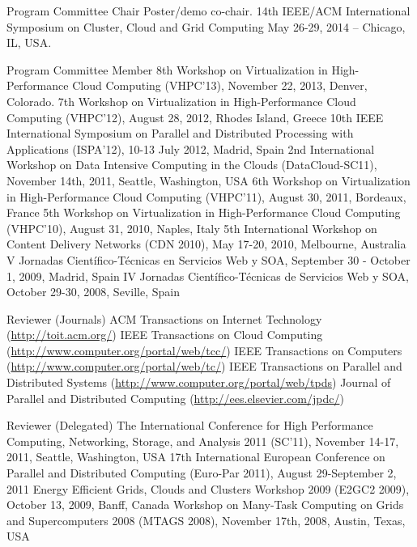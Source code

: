 \documentclass{resume}
\begin{document}
\begin{category}{Program Committee Chair}
\citembullet Poster/demo co-chair. 14th IEEE/ACM International Symposium on Cluster, Cloud and Grid Computing
May 26-29, 2014 -- Chicago, IL, USA.
\end{category}

\vspace{1em}

\begin{category}{Program Committee Member}
\citembullet 8th Workshop on Virtualization in High-Performance Cloud Computing (VHPC'13), November 22, 2013, Denver, Colorado.
\citembullet 7th Workshop on Virtualization in High-Performance Cloud Computing (VHPC'12), August 28, 2012, Rhodes Island, Greece
\citembullet 10th IEEE International Symposium on Parallel and Distributed Processing with Applications (ISPA'12), 10-13 July 2012, Madrid, Spain 
\citembullet 2nd International Workshop on Data Intensive Computing in the Clouds (DataCloud-SC11), November 14th, 2011, Seattle, Washington, USA
\citembullet 6th Workshop on Virtualization in High-Performance Cloud Computing (VHPC'11), August 30, 2011, Bordeaux, France
\citembullet 5th Workshop on Virtualization in High-Performance Cloud Computing (VHPC'10), August 31, 2010, Naples, Italy
\citembullet 5th International Workshop on Content Delivery Networks (CDN 2010), May 17-20, 2010, Melbourne, Australia
\citembullet V Jornadas Científico-Técnicas en Servicios Web y SOA, September 30 - October 1, 2009, Madrid, Spain
\citembullet IV Jornadas Científico-Técnicas de Servicios Web y SOA, October 29-30, 2008, Seville, Spain
\end{category}

\begin{category}{Reviewer (Journals)}
\citembullet ACM Transactions on Internet Technology (\url{http://toit.acm.org/})
\citembullet IEEE Transactions on Cloud Computing (\url{http://www.computer.org/portal/web/tcc/})
\citembullet IEEE Transactions on Computers (\url{http://www.computer.org/portal/web/tc/})
\citembullet IEEE Transactions on Parallel and Distributed Systems (\url{http://www.computer.org/portal/web/tpds})
\citembullet Journal of Parallel and Distributed Computing (\url{http://ees.elsevier.com/jpdc/})
\end{category}

\begin{category}{Reviewer (Delegated)}
\citembullet The International Conference for High Performance Computing, Networking, Storage, and Analysis 2011 (SC'11), November 14-17, 2011, Seattle, Washington, USA
\citembullet 17th International European Conference on Parallel and Distributed Computing (Euro-Par 2011), August 29-September 2, 2011 
\citembullet Energy Efficient Grids, Clouds and Clusters Workshop 2009 (E2GC2 2009), October 13, 2009, Banff, Canada 
\citembullet Workshop on Many-Task Computing on Grids and Supercomputers 2008 (MTAGS 2008), November 17th, 2008, Austin, Texas, USA
\end{category}
\end{document}
